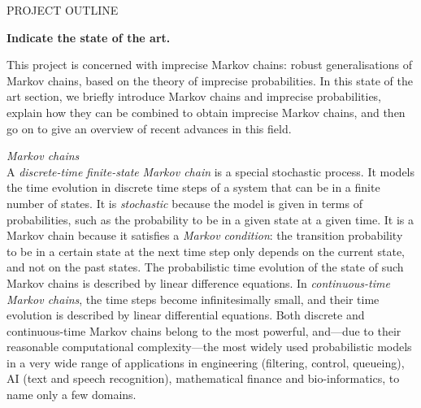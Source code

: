\documentclass[11pt,dvipsnames,usenames,a4paper]{article}
\begin{document}
\newpage
{}

\setcounter{page}{1}

\begin{shaded}\centering PROJECT OUTLINE \end{shaded}


\textbf{Indicate the state of the art.}
\vspace{-2pt}

This project is concerned with imprecise Markov chains: robust generalisations of Markov chains, based on the theory of imprecise probabilities. 
In this state of the art section, we briefly introduce Markov chains and imprecise probabilities, explain how they can be combined to obtain imprecise Markov chains, and then go on to give an overview of recent advances in this field.

\emph{Markov chains}\\[5pt]
A \emph{discrete-time} \emph{finite-state} \emph{Markov chain} is a special stochastic process. 
It models the time evolution in discrete time steps of a system that can be in a finite number of states.
It is \emph{stochastic} because the model is given in terms of probabilities, such as the probability to be in a given state at a given time.
It is a Markov chain because it satisfies a \emph{Markov condition}: the transition probability to be in a certain state at the next time step only depends on the current state, and not on the past states.
The probabilistic time evolution of the state of such Markov chains is described by linear difference equations.
In \emph{continuous-time Markov chains}, the time steps become infinitesimally small, and their time evolution is described by linear differential equations. 
Both discrete and continuous-time Markov chains belong to the most powerful, and---due to their reasonable computational complexity---the most widely used probabilistic models in a very wide range of applications in engineering (filtering, control, queueing), AI (text and speech recognition), mathematical finance and bio-informatics, to name only a few domains.
\end{document}
